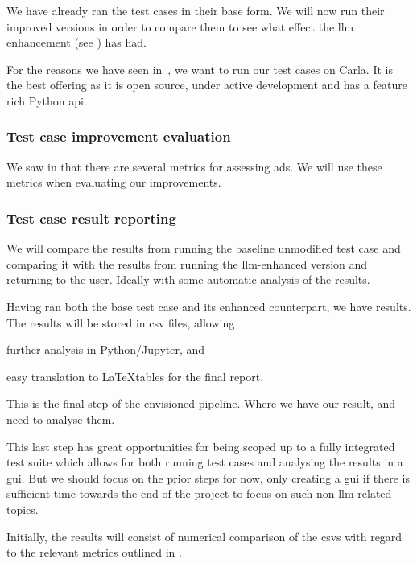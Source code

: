 We have already ran the test cases in their base form. We will now run their
improved versions in order to compare them to see what effect the \acrshort{llm}
enhancement (see ) has had.

For the reasons we have seen in~, we want to run our
test cases on Carla. It is the best offering as it is open source, under active
development and has a feature rich Python \acrshort{api}.

\subsubsection{Test case improvement evaluation}\label{sec:testCaseEval}

We saw in  that there are several metrics for assessing
\acrshort{ads}. We will use these metrics when evaluating our improvements.

\subsubsection{Test case result reporting}

We will compare the results from running
the baseline unmodified test case and comparing it with the results from
running the \acrshort{llm}-enhanced version and returning to the user. Ideally with
some automatic analysis of the results.

Having ran both the base test case and its enhanced counterpart, we have
results. The results will be stored in \acrfull{csv} files, allowing \begin{inparaenum}
    \item further analysis in Python/Jupyter,
    and
    \item easy translation to \LaTeX tables for the final report.
\end{inparaenum}

This is the final step of the envisioned pipeline. Where we have our result, and
need to analyse them.

This last step has great opportunities for being scoped up to a fully integrated
test suite which allows for both running test cases and analysing the results in
a \acrfull{gui}. But we should focus on the prior steps for now, only creating a
\acrshort{gui} if there is sufficient time towards the end of the project to
focus on such non-\acrshort{llm} related topics.

Initially, the results will consist of numerical comparison of the
\acrshort{csv}s with regard to the relevant metrics outlined in
.

